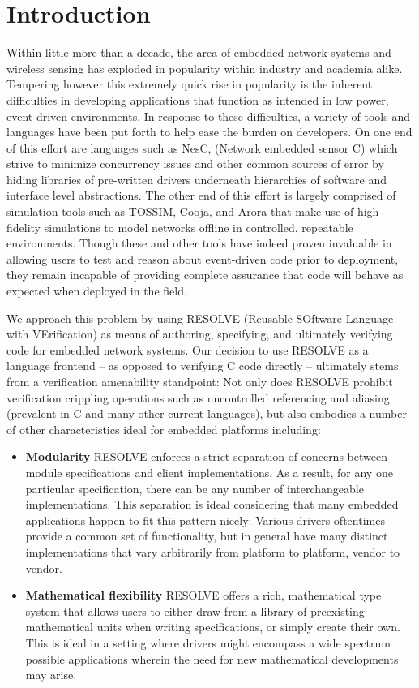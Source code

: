 \documentclass{sig-alternate}
\begin{document}
\section{Introduction}
\label{sec:intro}
Within little more than a decade, the area of embedded network systems and wireless sensing has exploded in popularity within industry and academia alike. Tempering however this extremely quick rise in popularity is the inherent difficulties in developing applications that function as intended in low power, event-driven environments. In response to these difficulties, a variety of tools and languages have been put forth  to help ease the burden on developers. On one end of this effort are languages such as NesC, (Network embedded sensor C) which strive to minimize concurrency issues and other common sources of error by hiding libraries of pre-written drivers underneath hierarchies of software and interface level abstractions. The other end of this effort is largely comprised of simulation tools such as TOSSIM, Cooja, and Arora that make use of high-fidelity simulations to model networks offline in controlled, repeatable environments. Though these and other tools have indeed proven invaluable in allowing users to test and reason about event-driven code prior to deployment, they remain incapable of providing complete assurance that code will behave as expected when deployed in the field.

We approach this problem by using RESOLVE (Reusable SOftware Language with VErification) as means of authoring, specifying, and ultimately verifying code for embedded network systems. Our decision to use RESOLVE as a language frontend -- as opposed to verifying C code directly -- ultimately stems from a verification amenability standpoint: Not only does RESOLVE prohibit verification crippling operations such as uncontrolled referencing and aliasing (prevalent in C and many other current languages)\cite{kulczycki:2004}, but also embodies a number of other characteristics ideal for embedded platforms including:

\begin{itemize}
\item \textbf{Modularity} RESOLVE enforces a strict separation of concerns between module specifications and client implementations. As a result, for any one particular specification, there can be any number of interchangeable implementations. This separation is ideal considering that many embedded applications happen to fit this pattern nicely: Various drivers oftentimes provide a common set of functionality, but in general have many distinct implementations that vary arbitrarily from platform to platform, vendor to vendor.

\item \textbf{Mathematical flexibility} RESOLVE offers a rich, mathematical type system that allows users to either draw from a library of preexisting mathematical units when writing specifications, or simply create their own. This is ideal in a setting where drivers might encompass a wide spectrum possible applications wherein the need for new mathematical developments may arise.%

\end{itemize}
\end{document}
